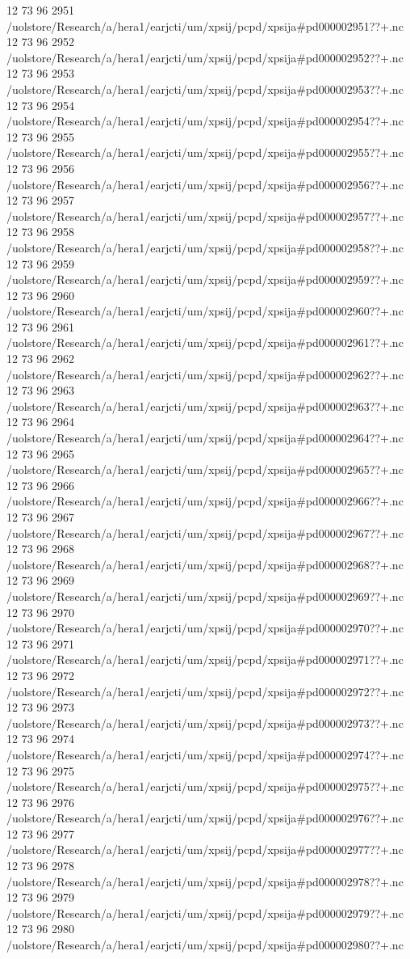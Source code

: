 12 73 96
2951
/uolstore/Research/a/hera1/earjcti/um/xpsij/pcpd/xpsija#pd000002951??+.nc
12 73 96
2952
/uolstore/Research/a/hera1/earjcti/um/xpsij/pcpd/xpsija#pd000002952??+.nc
12 73 96
2953
/uolstore/Research/a/hera1/earjcti/um/xpsij/pcpd/xpsija#pd000002953??+.nc
12 73 96
2954
/uolstore/Research/a/hera1/earjcti/um/xpsij/pcpd/xpsija#pd000002954??+.nc
12 73 96
2955
/uolstore/Research/a/hera1/earjcti/um/xpsij/pcpd/xpsija#pd000002955??+.nc
12 73 96
2956
/uolstore/Research/a/hera1/earjcti/um/xpsij/pcpd/xpsija#pd000002956??+.nc
12 73 96
2957
/uolstore/Research/a/hera1/earjcti/um/xpsij/pcpd/xpsija#pd000002957??+.nc
12 73 96
2958
/uolstore/Research/a/hera1/earjcti/um/xpsij/pcpd/xpsija#pd000002958??+.nc
12 73 96
2959
/uolstore/Research/a/hera1/earjcti/um/xpsij/pcpd/xpsija#pd000002959??+.nc
12 73 96
2960
/uolstore/Research/a/hera1/earjcti/um/xpsij/pcpd/xpsija#pd000002960??+.nc
12 73 96
2961
/uolstore/Research/a/hera1/earjcti/um/xpsij/pcpd/xpsija#pd000002961??+.nc
12 73 96
2962
/uolstore/Research/a/hera1/earjcti/um/xpsij/pcpd/xpsija#pd000002962??+.nc
12 73 96
2963
/uolstore/Research/a/hera1/earjcti/um/xpsij/pcpd/xpsija#pd000002963??+.nc
12 73 96
2964
/uolstore/Research/a/hera1/earjcti/um/xpsij/pcpd/xpsija#pd000002964??+.nc
12 73 96
2965
/uolstore/Research/a/hera1/earjcti/um/xpsij/pcpd/xpsija#pd000002965??+.nc
12 73 96
2966
/uolstore/Research/a/hera1/earjcti/um/xpsij/pcpd/xpsija#pd000002966??+.nc
12 73 96
2967
/uolstore/Research/a/hera1/earjcti/um/xpsij/pcpd/xpsija#pd000002967??+.nc
12 73 96
2968
/uolstore/Research/a/hera1/earjcti/um/xpsij/pcpd/xpsija#pd000002968??+.nc
12 73 96
2969
/uolstore/Research/a/hera1/earjcti/um/xpsij/pcpd/xpsija#pd000002969??+.nc
12 73 96
2970
/uolstore/Research/a/hera1/earjcti/um/xpsij/pcpd/xpsija#pd000002970??+.nc
12 73 96
2971
/uolstore/Research/a/hera1/earjcti/um/xpsij/pcpd/xpsija#pd000002971??+.nc
12 73 96
2972
/uolstore/Research/a/hera1/earjcti/um/xpsij/pcpd/xpsija#pd000002972??+.nc
12 73 96
2973
/uolstore/Research/a/hera1/earjcti/um/xpsij/pcpd/xpsija#pd000002973??+.nc
12 73 96
2974
/uolstore/Research/a/hera1/earjcti/um/xpsij/pcpd/xpsija#pd000002974??+.nc
12 73 96
2975
/uolstore/Research/a/hera1/earjcti/um/xpsij/pcpd/xpsija#pd000002975??+.nc
12 73 96
2976
/uolstore/Research/a/hera1/earjcti/um/xpsij/pcpd/xpsija#pd000002976??+.nc
12 73 96
2977
/uolstore/Research/a/hera1/earjcti/um/xpsij/pcpd/xpsija#pd000002977??+.nc
12 73 96
2978
/uolstore/Research/a/hera1/earjcti/um/xpsij/pcpd/xpsija#pd000002978??+.nc
12 73 96
2979
/uolstore/Research/a/hera1/earjcti/um/xpsij/pcpd/xpsija#pd000002979??+.nc
12 73 96
2980
/uolstore/Research/a/hera1/earjcti/um/xpsij/pcpd/xpsija#pd000002980??+.nc
